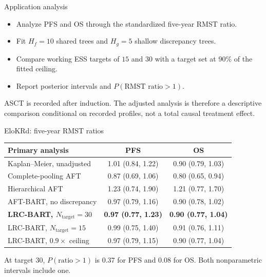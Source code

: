 \documentclass[11pt,aspectratio=169]{beamer}
\newcommand{\target}{N_{\mathrm{target}}}
\begin{document}
\begin{frame}{Application analysis}
  \large
  \begin{itemize}\setlength\itemsep{0.72em}
    \item Analyze PFS and OS through the standardized five-year RMST ratio.
    \item Fit $H_f=10$ shared trees and $H_g=5$ shallow discrepancy trees.
    \item Compare working ESS targets of $15$ and $30$ with a target set at $90\%$ of the fitted ceiling.
    \item Report posterior intervals and $P(\text{RMST ratio}>1)$.
  \end{itemize}

  \vfill
  {\small ASCT is recorded after induction. The adjusted analysis is therefore a descriptive comparison conditional on recorded profiles, not a total causal treatment effect.}
\end{frame}

\begin{frame}{EloKRd: five-year RMST ratios}
  \small
  \centering
  \setlength{\tabcolsep}{6pt}
  \renewcommand{\arraystretch}{1.12}
  \begin{tabular}{lcc}
    \toprule
    Primary analysis & PFS & OS \\
    \midrule
    Kaplan--Meier, unadjusted & 1.01 (0.84, 1.22) & 0.90 (0.79, 1.03) \\
    Complete-pooling AFT & 0.87 (0.69, 1.06) & 0.80 (0.65, 0.94) \\
    Hierarchical AFT & 1.23 (0.74, 1.90) & 1.21 (0.77, 1.70) \\
    AFT-BART, no discrepancy & 0.97 (0.79, 1.16) & 0.90 (0.78, 1.02) \\
    \midrule
    \textbf{LRC-BART, \(\target=30\)} & \textbf{0.97 (0.77, 1.23)} & \textbf{0.90 (0.77, 1.04)} \\
    LRC-BART, $\target=15$ & 0.99 (0.75, 1.40) & 0.91 (0.76, 1.11) \\
    LRC-BART, $0.9\times$ ceiling & 0.97 (0.79, 1.15) & 0.90 (0.77, 1.04) \\
    \bottomrule
  \end{tabular}

  \vspace{0.8em}
  \raggedright
  At target 30, $P(\text{ratio}>1)$ is $0.37$ for PFS and $0.08$ for OS. Both nonparametric intervals include one.
\end{frame}
\end{document}
